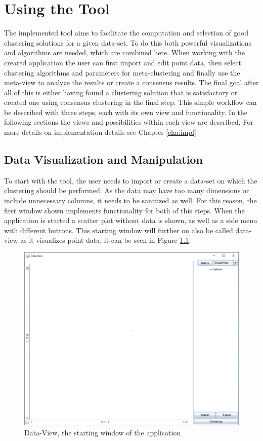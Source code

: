 \documentclass[
	a4paper,
	english,
	twoside,
	openright,               
	11pt                            
	]{report}
\begin{document}
\chapter{Using the Tool}\label{cha:Tool}
The implemented tool aims to facilitate the computation and selection of good clustering solutions for a given data-set. To do this both powerful visualizations and algorithms are needed, which are combined here. When working with the created application the user can first import and edit point data, then select clustering algorithms and parameters for meta-clustering and finally use the meta-view to analyze the results or create a consensus results. The final goal after all of this is either having found a clustering solution that is satisfactory or created one using consensus clustering in the final step. This simple workflow can be described with three steps, each with its own view and functionality. In the following sections the views and possibilities within each view are described. For more details on implementation details see Chapter \ref{cha:impl}

\section{Data Visualization and Manipulation}
To start with the tool, the user needs to import or create a data-set on which the clustering should be performed. As the data may have too many dimensions or include unnecessary columns, it needs to be sanitized as well. For this reason, the first window shown implements functionality for both of this steps. When the application is started a scatter plot without data is shown, as well as a side menu with different buttons. This starting window will further on also be called data-view as it visualizes point data, it can be seen in Figure \ref{fig:data-view}. 

\begin{figure}[h]
	\centering
	\includegraphics[scale=.45]{data-view}
	\caption{Data-View, the starting window of the application}
	\label{fig:data-view}
\end{figure}
\end{document}
